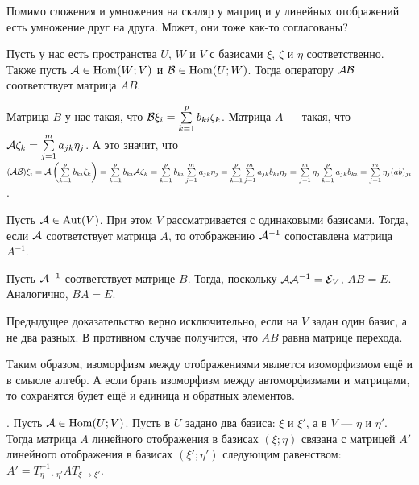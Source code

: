 \documentclass{article}
\newcommand{\id}{{\mathcal{E}}}
\begin{document}
\begin{itemize}
\begin{Proof}
        \end{Proof}
        \begin{Comment}
            Помимо сложения и умножения на скаляр у матриц и у линейных отображений есть умножение друг на друга. Может, они тоже как-то согласованы?
        \end{Comment}
        \thm Пусть у нас есть пространства $U$, $W$ и $V$ с базисами $\xi$, $\zeta$ и $\eta$ соответственно. Также пусть ${\mathcal{A}}\in\operatorname{Hom}(W;V)$ и ${\mathcal{B}}\in\operatorname{Hom}(U;W)$. Тогда оператору ${\mathcal{A}}{\mathcal{B}}$ соответствует матрица $AB$.
        \begin{Proof}
            Матрица $B$ у нас такая, что ${\mathcal{B}}\xi_i=\sum\limits_{k=1}^pb_{ki}\zeta_k$. Матрица $A$ --- такая, что ${\mathcal{A}}\zeta_k=\sum\limits_{j=1}^ma_{jk}\eta_j$. А это значит, что $({\mathcal{A}}{\mathcal{B}})\xi_i={\mathcal{A}}\left(\sum\limits_{k=1}^pb_{ki}\zeta_k\right)=\sum\limits_{k=1}^pb_{ki}{\mathcal{A}}\zeta_k=\sum\limits_{k=1}^pb_{ki}\sum\limits_{j=1}^ma_{jk}\eta_j=\sum\limits_{k=1}^p\sum\limits_{j=1}^ma_{jk}b_{ki}\eta_j=\sum\limits_{j=1}^m\eta_j\sum\limits_{k=1}^pa_{jk}b_{ki}=\sum\limits_{j=1}^m\eta_j(ab)_{ji}$.
        \end{Proof}
        \thm Пусть ${\mathcal{A}}\in\operatorname{Aut}(V)$. При этом $V$ рассматривается с одинаковыми базисами. Тогда, если ${\mathcal{A}}$ соответствует матрица $A$, то отображению ${\mathcal{A}}^{-1}$ сопоставлена матрица $A^{-1}$.
        \begin{Proof}
            Пусть ${\mathcal{A}}^{-1}$ соответствует матрице $B$. Тогда, поскольку $\scriptA\scriptA^{-1}=\id_V$, $AB=E$. Аналогично, $BA=E$.
        \end{Proof}
        \begin{Comment}
            Предыдущее доказательство верно исключительно, если на $V$ задан один базис, а не два разных. В противном случае получится, что $AB$ равна матрице перехода.
        \end{Comment}
        \begin{Comment}
            Таким образом, изоморфизм между отображениями является изоморфизмом ещё и в смысле алгебр. А если брать изоморфизм между автоморфизмами и матрицами, то сохранятся будет ещё и единица и обратных элементов.
        \end{Comment}
        \thm {}. Пусть ${\mathcal{A}}\in\operatorname{Hom}(U;V)$. Пусть в $U$ задано два базиса: $\xi$ и $\xi'$, а в $V$ --- $\eta$ и $\eta'$. Тогда матрица $A$ линейного отображения в базисах $(\xi;\eta)$ связана с матрицей $A'$ линейного отображения в базисах $(\xi';\eta')$ следующим равенством: $A'=T^{-1}_{\eta\to\eta'}AT_{\xi\to\xi'}$.

\end{itemize}
\end{document}
